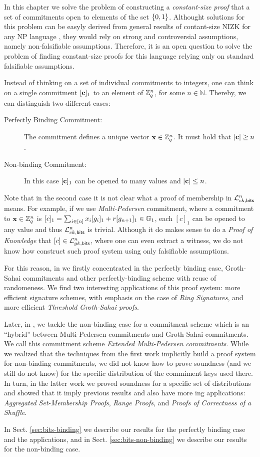 In this chapter we solve the problem of constructing a \emph{constant-size proof} that a set of commitments open to elements of the set $\{0,1\}$.
Althought solutions for this problem can be easyly derived from general results of contant-size NIZK for any NP language \cite{EC:GGPR13,AC:DFGK14,EC:Groth16}, they would rely on strong and controversial assumptions, namely non-falsifiable assumptions. Therefore, it is an open question to solve the problem of finding constant-size proofs for this language relying only on standard falsifiable assumptions. 

Instead of thinking on a set of individual commitments to integers, one can think on a single commitment $[\mathbf{c}]_1$ to an element of $\mathbb{Z}_q^n$, for some $n\in\mathbb{N}$. Thereby, we can distinguish two different cases:

\begin{description}
\item[Perfectly Binding Commitment:] The commitment defines a unique vector $\mathbf{x}\in\mathbb{Z}_q^n$. It must hold that $|\mathbf{c}|\geq n$.
\item[Non-binding Commitment:] In this case $[\mathbf{c}]_1$ can be opened to many values and $|\mathbf{c}|\leq n$.
\end{description}

Note that in the second case it is not clear what a proof of membership in $\mathcal{L}_{ck,\mathsf{bits}}^n$ means. For example, if we use \emph{Multi-Pedersen} commitment, where a commitment to $\mathbf{x}\in\mathbb{Z}_q^n$ is $[c]_1=\sum_{i\in[n]}x_i[g_i]_1+r[g_{n+1}]_1\in\mathbb{G}_1$, each $[c]_1$ can be opened to any value and thus $\mathcal{L}_{ck,\mathsf{bits}}^n$ is trivial. Although it do makes sense to do a \emph{Proof of Knowledge} that $[c]\in\mathcal{L}_{gk,\mathsf{bits}}^n$, where one can even extract a witness, we do not know how construct such proof system using only falsifiable assumptions.

For this reason, in \cite{AC:GonHevRaf15} we firstly concentrated in the perfectly binding case, Groth-Sahai commitments and other perfectly-binding scheme with reuse of randomeness. We find two interesting applications of this proof system: more efficient signature schemes, with emphasis on the case of \emph{Ring Signatures}, and more efficient \emph{Threshold Groth-Sahai proofs}.
 
Later, in \cite{ACNS:GonRaf16}, we tackle the non-binding case for a commitment scheme which is an ``hybrid'' between Multi-Pedersen commitments and Groth-Sahai commitments. We call this commitment scheme \emph{Extended Multi-Pedersen commitments}. 
While we realized that the techniques from the first work implicitly build a proof system for non-binding commitments, we did not know how to prove soundness (and we still do not know) for the specific distribution of the commiment keys used there. In turn, in the latter work we proved soundness for a specific set of distributions and showed that it imply previous results and also have more ing applications: \emph{Aggregated Set-Membership Proofs}, \emph{Range Proofs}, and \emph{Proofs of Correctness of a Shuffle}.

In Sect. \ref{sec:bits-binding} we describe our results for the perfectly binding case and the applications, and in Sect. \ref{sec:bits-non-binding} we describe our results for the non-binding case.
